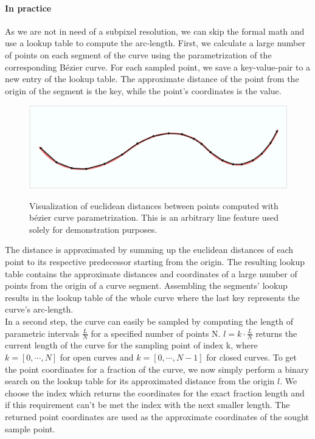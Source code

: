 \paragraph{In practice}
As we are not in need of a subpixel resolution, we can skip the formal math and use a lookup table to compute the arc-length. First, we calculate a large number of points on each segment of the curve using the parametrization of the corresponding B\'{e}zier curve. For each sampled point, we save a key-value-pair to a new entry of the lookup table. The approximate distance of the point from the origin of the segment is the key, while the point's coordinates is the value. 
\begin{figure}[h!]
\centering
\includegraphics[width=\textwidth]{./resources/figures/distance_computation.pdf}
\label{fig:lookup}
\caption{Visualization of euclidean distances between points computed with b\'{e}zier curve parametrization. This is an arbitrary line feature used solely for demonstration purposes.}
\end{figure}
The distance is approximated by summing up the euclidean distances of each point to its respective predecessor starting from the origin. The resulting lookup table contains the approximate distances and coordinates of a large number of points from the origin of a curve segment. Assembling the segments' lookup results in the lookup table of the whole curve where the last key represents the curve's arc-length.\\ 
In a second step, the curve can easily be sampled by computing the length of parametric intervals $\frac{L}{N}$ for a specified number of points N. $l=k \cdot \frac{L}{N}$ returns the current length of the curve for the sampling point of index k, where $k=[0,\cdots,N]$ for open curves and $k=[0,\cdots,N-1]$ for closed curves.
To get the point coordinates for a fraction of the curve, we now simply perform a binary search on the lookup table for its approximated distance from the origin $l$. We choose the index which returns the coordinates for the exact fraction length and if this requirement can't be met the index with the next smaller length. The returned point coordinates are used as the approximate coordinates of the sought sample point.
